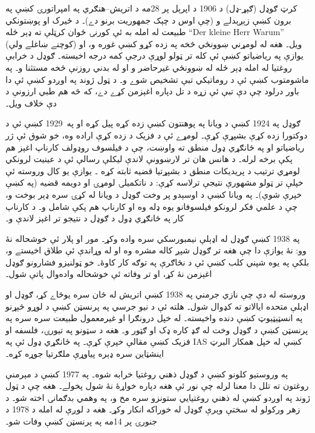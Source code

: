 \documentclass[../../../include/open-logic-section]{subfiles}
\begin{document}



کرټ ګوډل (\textsc{ګېړ}-ډل) د 1906 د اپرېل پر
28مه د اتريش--هنګري په امپراتورۍ کښې په برون
کښې زېږېدلے و (چې اوس د چېک جمهوريت برنو دے)۔
د ځيرک او پوښتونکي طبيعت له امله به ئې کورنۍ
ځوان کرټلې ته ډېر ځله ``Der kleine Herr Warum''
(کوچنے ښاغلے ولې) ويل۔ هغه له لومړني ښوونځي
څخه په زده کړو کښې غوره و، او يوازې په
رياضياتو کښې ئې کله تر ټولو لوړې درجې کمه
درجه اخيسته۔ ګوډل د خرابې روغتيا له امله
ډېر ځله له ښوونځي غيرحاضر و او له بدني روزنې
څخه مستثنا و۔ په ماشومتوب کښې ئې د روماتيکي
تبې تشخيص شوے و۔ د ټول ژوند په اوږدو کښې ئې
دا باور درلود چې دې تبې ئې زړه د تل دپاره
اغېزمن کړے دے، که څه هم طبي ارزونې د دې
خلاف ويل۔

ګوډل په 1924 کښې د ويانا په پوهنتون کښې زده
کړه پيل کړه او په~1929 کښې ئې د دوکتورا زده
کړې بشپړې کړې۔ لومړے ئې د فزيک د زده کړې
اراده وه، خو شوق ئې ژر رياضياتو او په ځانګړي
ډول منطق ته واوښت، چې د فيلسوف روډولف کارناپ
اغېز هم پکې برخه لرله۔ د هانس هان تر
لارښوونې لاندې ليکلې رسالې ئې د عينيت لرونکي
لومړي ترتيب د پريديکات منطق د بشپړتيا قضيه
ثابته کړه \citep{Godel1929}۔ يوازې يو کال
وروسته ئې خپلې تر ټولو مشهورې نتيجې ترلاسه
کړې: د ناتکميلۍ لومړۍ او دويمه قضيه
(په \citealt{Godel1931} کښې خپرې شوې)۔ په
ويانا کښې د اوسېدو پر وخت ګوډل د ويانا له
کړۍ سره ډېر بوخت و، چې د علمي فکر لرونکو
فيلسوفانو يوه ډله وه او کارناپ هم پکې شامل
و۔ د کارناپ کار په ځانګړي ډول د ګوډل د
نتيجو تر اغېز لاندې و۔

په 1938 کښې ګوډل له اډېلې نيمبورسکي سره واده
وکړ۔ مور او پلار ئې خوشحاله نۀ وو: نۀ يوازې
دا چې هغه تر ګوډل شپږ کاله مشره وه او له
وړاندې ئې طلاق اخيستے و، بلکې په يوه شپني
کلب کښې ئې د نڅاګرې په توګه کار کاوۀ۔ خو
ټولنيزو فشارونو ګوډل اغېزمن نۀ کړ، او تر
وفاته ئې خوشحاله واده‌وال پاتې شول۔

وروسته له دې چې نازي جرمني په 1938 کښې
اتريش له ځان سره يوځاے کړ، ګوډل او اډېلې
متحده ايالاتو ته کډوال شول۔ هلته ئې د
نيو جرسي په پرنسټن کښې د لوړو څېړنو په
انسټيټيوټ کښې دنده واخيسته۔ له خپل درونګرا
او غيرمعمول طبيعت سره سره په پرنسټن کښې
د ګوډل وخت له ګډ کاره ډک او ګټور و۔ هغه
د سټونو په تيورۍ، فلسفه او فزيک کښې مقالې
خپرې کړې۔ په ځانګړي ډول ئې په IAS کښې
له خپل همکار البرټ اينشټاين سره ډېره
پياوړې ملګرتيا جوړه کړه۔

په وروستيو کلونو کښې د ګوډل ذهني روغتيا
خرابه شوه۔ په 1977 کښې د مېرمنې روغتون ته
تلل دا معنا لرله چې نور ئې هغه دپاره
خواړۀ نۀ شول پخولے۔ هغه چې د ټول ژوند
په اوږدو کښې له ذهني روغتيايي ستونزو سره
مخ و، په وهمي بدګمانۍ اخته شو۔ د زهر ورکولو
له سختې وېرې ګوډل له خوراکه انکار وکړ۔
هغه د لوږې له امله د 1978 د جنورۍ پر
14مه په پرنسټن کښې وفات شو۔
\end{document}
